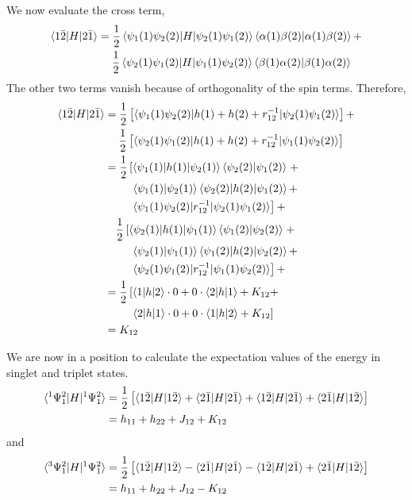 \begin{enumerate}
We now evaluate the cross term,
\[
\begin{aligned}
\braket{1\bar{2}|H|2\bar{1}} &= \frac{1}{2}\braket{\psi_1(1)\psi_2(2)|H|\psi_2(1)
\psi_1(2)}\braket{\alpha(1)\beta(2)|\alpha(1)\beta(2)} + \\
&\quad\;\frac{1}{2}\braket{\psi_2(1)\psi_1(2)|H|\psi_1(1)\psi_2(2)}
\braket{\beta(1)\alpha(2)|\beta(1)\alpha(2)}
\end{aligned}
\]
The other two terms vanish because of orthogonality of the spin terms. Therefore,
\[
\begin{aligned}
\braket{1\bar{2}|H|2\bar{1}} &= \frac{1}{2}\left[\braket{\psi_1(1)\psi_2(2)|
h(1) + h(2) + r_{12}^{-1}|\psi_2(1)\psi_1(2)}\right] + \\
&\;\quad\frac{1}{2}\left[\braket{\psi_2(1)\psi_1(2)|h(1) + h(2) + r_{12}^{-1}|
  \psi_1(1)\psi_2(2)}\right] \\
&= \frac{1}{2}\left[
\braket{\psi_1(1)|h(1)|\psi_2(1)}\braket{\psi_2(2)|\psi_1(2)} \right. + \\
&\quad\quad\;\left.
\braket{\psi_1(1)|\psi_2(1)}\braket{\psi_2(2)|h(2)|\psi_1(2)} + \right. \\
&\quad\quad\;\left.
\braket{\psi_1(1)\psi_2(2)|r_{12}^{-1}|\psi_2(1)\psi_1(2)}\right] + \\
&\quad\frac{1}{2}\left[
\braket{\psi_2(1)|h(1)|\psi_1(1)}\braket{\psi_1(2)|\psi_2(2)} \right. + \\
&\quad\quad\;\left.
\braket{\psi_2(1)|\psi_1(1)}\braket{\psi_1(2)|h(2)|\psi_2(2)} + \right. \\
&\quad\quad\;\left.
\braket{\psi_2(1)\psi_1(2)|r_{12}^{-1}|\psi_1(1)\psi_2(2)}\right] + \\
&= \frac{1}{2}\left[\braket{1|h|2}\cdot 0 + 0\cdot\braket{2|h|1}+K_{12}+\right.\\
&\quad\quad\;\left.\braket{2|h|1}\cdot 0 + 0\cdot\braket{1|h|2} + K_{12}\right] \\
&= K_{12}
\end{aligned}
\]

We are now in a position to calculate the expectation values of the energy in
singlet and triplet states.
\[
\begin{aligned}
\braket{^1\Psi_1^2|H|^1\Psi_1^2} &= \frac{1}{2}\left[\braket{1\bar{2}|H|1\bar{2}}
+ \braket{2\bar{1}|H|2\bar{1}} + \braket{1\bar{2}|H|2\bar{1}} +
\braket{2\bar{1}|H|1\bar{2}}\right] \\
&= h_{11} + h_{22} + J_{12} + K_{12}
\end{aligned}
\]
and
\[
\begin{aligned}
\braket{^3\Psi_1^2|H|^1\Psi_1^2} &= \frac{1}{2}\left[\braket{1\bar{2}|H|1\bar{2}}
- \braket{2\bar{1}|H|2\bar{1}} - \braket{1\bar{2}|H|2\bar{1}} +
\braket{2\bar{1}|H|1\bar{2}}\right] \\
&= h_{11} + h_{22} + J_{12} - K_{12}
\end{aligned}
\]


\end{enumerate}
